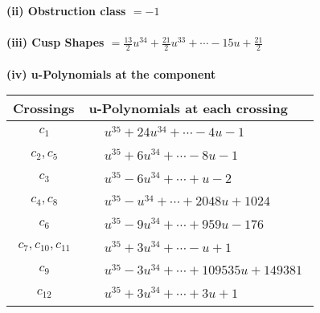 \documentclass[1p]{elsarticle_modified}
\theoremstyle{definition}
\begin{document}
\flushleft \textbf{(ii) Obstruction class $= -1$}\\~\\
\flushleft \textbf{(iii) Cusp Shapes $= \frac{13}{2} u^{34}+\frac{21}{2} u^{33}+\cdots-15 u+\frac{21}{2}$}\\~\\
\newpage\renewcommand{\arraystretch}{1}
\flushleft \textbf{(iv) u-Polynomials at the component}\newline \\
\begin{tabular}{m{50pt}|m{274pt}}
Crossings & \hspace{64pt}u-Polynomials at each crossing \\
\hline $$\begin{aligned}c_{1}\end{aligned}$$&$\begin{aligned}
&u^{35}+24 u^{34}+\cdots-4 u-1
\end{aligned}$\\
\hline $$\begin{aligned}c_{2},c_{5}\end{aligned}$$&$\begin{aligned}
&u^{35}+6 u^{34}+\cdots-8 u-1
\end{aligned}$\\
\hline $$\begin{aligned}c_{3}\end{aligned}$$&$\begin{aligned}
&u^{35}-6 u^{34}+\cdots+u-2
\end{aligned}$\\
\hline $$\begin{aligned}c_{4},c_{8}\end{aligned}$$&$\begin{aligned}
&u^{35}- u^{34}+\cdots+2048 u+1024
\end{aligned}$\\
\hline $$\begin{aligned}c_{6}\end{aligned}$$&$\begin{aligned}
&u^{35}-9 u^{34}+\cdots+959 u-176
\end{aligned}$\\
\hline $$\begin{aligned}c_{7},c_{10},c_{11}\end{aligned}$$&$\begin{aligned}
&u^{35}+3 u^{34}+\cdots- u+1
\end{aligned}$\\
\hline $$\begin{aligned}c_{9}\end{aligned}$$&$\begin{aligned}
&u^{35}-3 u^{34}+\cdots+109535 u+149381
\end{aligned}$\\
\hline $$\begin{aligned}c_{12}\end{aligned}$$&$\begin{aligned}
&u^{35}+3 u^{34}+\cdots+3 u+1
\end{aligned}$\\
\hline
\end{tabular}\\~\\
\end{document}
